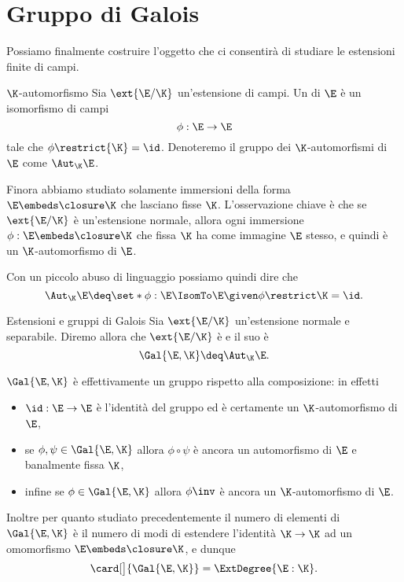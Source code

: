 \section{Gruppo di Galois}

Possiamo finalmente costruire l'oggetto che ci consentirà di studiare le estensioni finite di campi.

\begin{definition}
    {$\K$-automorfismo}{}
    Sia $\ext{\E / \K}$ un'estensione di campi. Un  di $\E$ è un isomorfismo di campi \[
        \phi : \E \to \E
    \] tale che $\phi\restrict{\K} = \id$. Denoteremo il gruppo dei $\K$-automorfismi di $\E$ come $\Aut_{\K}{\E}$. 
\end{definition}

Finora abbiamo studiato solamente immersioni della forma $\E \embeds \closure\K$ che lasciano fisse $\K$. L'osservazione chiave è che se $\ext{\E / \K}$ è un'estensione normale, allora ogni immersione $\phi : \E \embeds \closure\K$ che fissa $\K$ ha come immagine $\E$ stesso, e quindi è un $\K$-automorfismo di $\E$.

Con un piccolo abuso di linguaggio possiamo quindi dire che \[
    \Aut_{\K}{\E} \deq \set*{\phi : \E \IsomTo \E \given \phi\restrict\K = \id}.
\]

\begin{definition}
    {Estensioni e gruppi di Galois}{}
    Sia $\ext{\E / \K}$ un'estensione normale e separabile. Diremo allora che $\ext{\E / \K}$ è  e il suo  è \[
        \Gal{\E, \K} \deq \Aut_{\K}{\E}.
    \]
\end{definition}

$\Gal{\E, \K}$ è effettivamente un gruppo rispetto alla composizione: in effetti \begin{itemize}
    \item $\id : \E \to \E$ è l'identità del gruppo ed è certamente un $\K$-automorfismo di $\E$,
    \item se $\phi, \psi \in \Gal{\E, \K}$ allora $\phi \circ \psi$ è ancora un automorfismo di $\E$ e banalmente fissa $\K$,
    \item infine se $\phi \in \Gal{\E, \K}$ allora $\phi\inv$ è ancora un $\K$-automorfismo di $\E$.  
\end{itemize}

Inoltre per quanto studiato precedentemente il numero di elementi di $\Gal{\E, \K}$ è il numero di modi di estendere l'identità $\K \to \K$ ad un omomorfismo $\E \embeds \closure\K$, e dunque \begin{equation}
    \card[\big]{\Gal{\E, \K}} = \ExtDegree{\E : \K}.
\end{equation}

